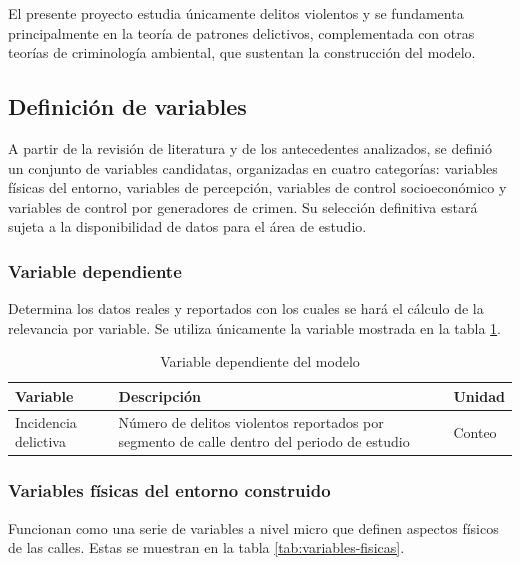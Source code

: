
El presente proyecto estudia únicamente delitos violentos y se fundamenta principalmente en la teoría de patrones delictivos, complementada con otras teorías de criminología ambiental\cite{brantingham1993}, que sustentan la construcción del modelo.

\subsection{Definición de variables}


A partir de la revisión de literatura y de los antecedentes analizados, se definió un conjunto de variables candidatas, organizadas en cuatro categorías: variables físicas del entorno, variables de percepción, variables de control socioeconómico y variables de control por generadores de crimen. Su selección definitiva estará sujeta a la disponibilidad de datos para el área de estudio.

\subsubsection{Variable dependiente}
Determina los datos reales y reportados con los cuales se hará el cálculo de la relevancia por variable. Se utiliza únicamente la variable mostrada en la tabla \ref{tab:variable-dependiente}.

\begin{table}[htbp]
\centering
\caption{Variable dependiente del modelo}
\label{tab:variable-dependiente}
\begin{tabular}{|p{3cm}|p{6cm}|p{3cm}|}
\hline
\textbf{Variable} & \textbf{Descripción} & \textbf{Unidad} \\ \hline
Incidencia delictiva & Número de delitos violentos reportados por segmento de calle dentro del periodo de estudio & Conteo \\ \hline
\end{tabular}
\end{table}

\subsubsection{Variables físicas del entorno construido}
Funcionan como una serie de variables a nivel micro que definen aspectos físicos de las calles. Estas se muestran en la tabla \ref{tab:variables-fisicas}.

